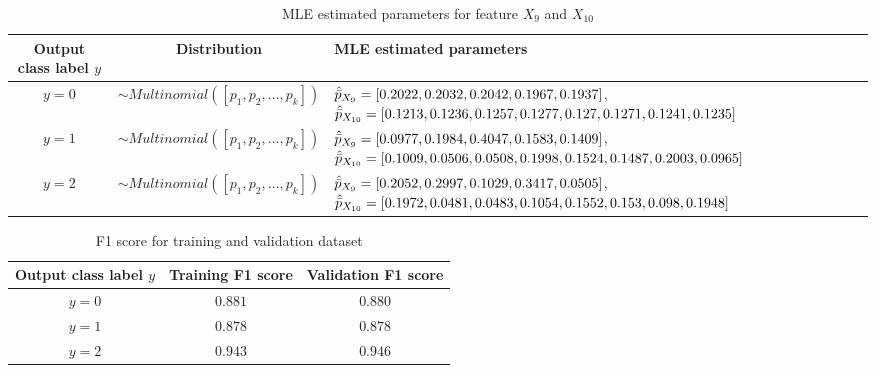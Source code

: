 \documentclass[12pt, a4paper, twoside]{article}
\begin{document}
{
	\renewcommand{\arraystretch}{2}
	\begin{table}[p]
		\begin{center}
			\begin{tabular}{c c p{7cm}}
				\hline
				Output class label $y$ & Distribution & MLE estimated parameters \\ \hline
				$y = 0$&  $\sim Multinomial([p_1, p_2, \dots , p_k])$& $\hat{\bar{p}}_{X_9} = [0.2022, 0.2032, 0.2042, \newline 0.1967, 0.1937]$, \newline $\hat{\bar{p}}_{X_{10}} = [0.1213, 0.1236, 0.1257, \newline 0.1277, 0.127, 0.1271, 0.1241, 0.1235]$ \\ \hline
				$y = 1$&  $\sim Multinomial([p_1, p_2, \dots , p_k])$& $\hat{\bar{p}}_{X_9} = [0.0977, 0.1984, 0.4047, \newline 0.1583, 0.1409]$, \newline $\hat{\bar{p}}_{X_{10}} = [0.1009, 0.0506, 0.0508, \newline 0.1998, 0.1524, 0.1487, 0.2003, 0.0965]$ \\ \hline
				$y = 2$&  $\sim Multinomial([p_1, p_2, \dots , p_k])$& $\hat{\bar{p}}_{X_9} = [0.2052, 0.2997, 0.1029, \newline 0.3417, 0.0505]$, \newline $\hat{\bar{p}}_{X_{10}} = [0.1972, 0.0481, 0.0483, \newline 0.1054, 0.1552, 0.153, 0.098, 0.1948]$ \\ \hline
			\end{tabular}
			\caption{MLE estimated parameters for feature $X_9$ and $X_{10}$}\label{T:mult}
		\end{center}
	\end{table}
}
{
	\renewcommand{\arraystretch}{2}
	\begin{table}[p]
		\begin{center}
			\begin{tabular}{c c c}
				\hline
				Output class label $y$ & Training F1 score & Validation F1 score \\ \hline
				$y = 0$ & $0.881$& $0.880$\\ \hline
				$y = 1$ & $0.878$& $0.878$ \\ \hline
				$y = 2$& $0.943$ &$0.946$ \\ \hline
			\end{tabular}
			\caption{F1 score for training and validation dataset}\label{T:f1}
		\end{center}
	\end{table}
}

\printbibliography
\end{document}
